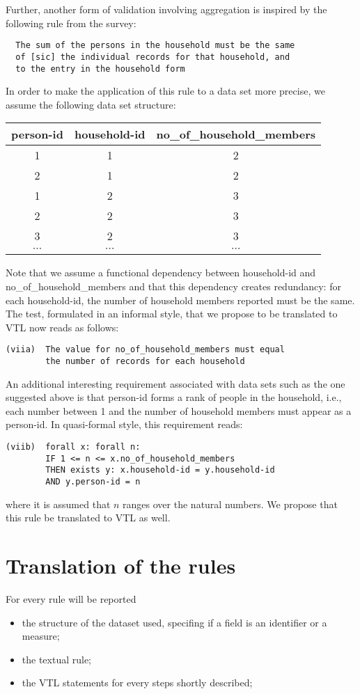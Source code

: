 Further, another form of validation involving aggregation is inspired by the following rule from the survey:
\begin{verbatim}
  The sum of the persons in the household must be the same
  of [sic] the individual records for that household, and
  to the entry in the household form
\end{verbatim}
In order to make the application of this rule to a data set more precise, we assume the following data set structure:
\begin{center}
\begin{tabular}[c]{|c|c|c|}
\hline
person-id & household-id & no\_of\_household\_members\\
\hline
\hline
1 & 1 & 2 \\
\hline
2 & 1 & 2 \\
\hline
1 & 2 & 3 \\
\hline
2 & 2 & 3 \\
\hline
3 & 2 & 3 \\
\hline
$\cdots$ & $\cdots$ & $\cdots$ \\
\hline
\end{tabular}
\end{center}
Note that we assume a functional dependency between household-id and no\_of\_household\_members and that this dependency creates redundancy: for each household-id, the number of household members reported must be the same. The test, formulated in an informal style, that we propose to be translated to VTL now reads as follows:
\begin{verbatim}
(viia)  The value for no_of_household_members must equal
        the number of records for each household
\end{verbatim}

An additional interesting requirement associated with data sets such as the one suggested above is that person-id forms a rank of people in the household, i.e., each number between 1 and the number of household members must appear as a person-id. In quasi-formal style, this requirement reads:
\begin{verbatim}
(viib)  forall x: forall n:
        IF 1 <= n <= x.no_of_household_members
        THEN exists y: x.household-id = y.household-id
        AND y.person-id = n
\end{verbatim}
where it is assumed that $n$ ranges over the natural numbers. We propose that this rule be translated to VTL as well.

\section{Translation of the rules}
For every rule will be reported
\begin{itemize}
\item the structure of the dataset used, specifing if a field is an identifier or a measure;
\item the textual rule;
\item the VTL statements for every steps shortly described;
\end{itemize}
 
